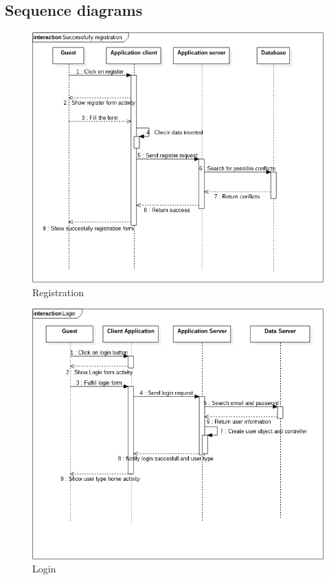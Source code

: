 	\subsection{Sequence diagrams}
\begin{figure} [h]
\centering
\includegraphics[scale=0.5]{Sequence Diagrams/successfully_registration.png}
\caption{ Registration }
\end{figure}
\newpage
\begin{figure} [h]
\centering
\includegraphics[scale=0.5]{Sequence Diagrams/login.png}
\caption{Login }
\end{figure}
